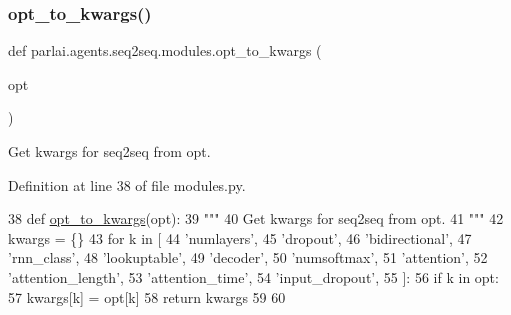 \subsubsection{\texorpdfstring{opt\+\_\+to\+\_\+kwargs()}{opt\_to\_kwargs()}}
{\footnotesize\ttfamily def parlai.\+agents.\+seq2seq.\+modules.\+opt\+\_\+to\+\_\+kwargs (\begin{DoxyParamCaption}\item[{}]{opt }\end{DoxyParamCaption})}

\begin{DoxyVerb}Get kwargs for seq2seq from opt.
\end{DoxyVerb}
 

Definition at line 38 of file modules.\+py.


\begin{DoxyCode}
38 \textcolor{keyword}{def }\hyperlink{namespaceprojects_1_1controllable__dialogue_1_1controllable__seq2seq_1_1modules_a29bd74b29a327dc6c2d4a3aaa9ec3c08}{opt\_to\_kwargs}(opt):
39     \textcolor{stringliteral}{"""}
40 \textcolor{stringliteral}{    Get kwargs for seq2seq from opt.}
41 \textcolor{stringliteral}{    """}
42     kwargs = \{\}
43     \textcolor{keywordflow}{for} k \textcolor{keywordflow}{in} [
44         \textcolor{stringliteral}{'numlayers'},
45         \textcolor{stringliteral}{'dropout'},
46         \textcolor{stringliteral}{'bidirectional'},
47         \textcolor{stringliteral}{'rnn\_class'},
48         \textcolor{stringliteral}{'lookuptable'},
49         \textcolor{stringliteral}{'decoder'},
50         \textcolor{stringliteral}{'numsoftmax'},
51         \textcolor{stringliteral}{'attention'},
52         \textcolor{stringliteral}{'attention\_length'},
53         \textcolor{stringliteral}{'attention\_time'},
54         \textcolor{stringliteral}{'input\_dropout'},
55     ]:
56         \textcolor{keywordflow}{if} k \textcolor{keywordflow}{in} opt:
57             kwargs[k] = opt[k]
58     \textcolor{keywordflow}{return} kwargs
59 
60 
\end{DoxyCode}

